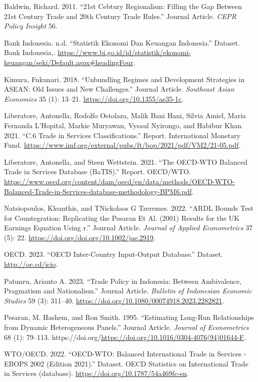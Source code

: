 \documentclass[
  a4paper,
  DIV=11,
  numbers=noendperiod]{scrreprt}
\newlength{\cslhangindent}
\newenvironment{CSLReferences}[2] %
 {\begin{list}{}{%
  \setlength{\itemindent}{0pt}
  \setlength{\leftmargin}{0pt}
  \setlength{\parsep}{0pt}
  \ifodd #1
   \setlength{\leftmargin}{\cslhangindent}
   \setlength{\itemindent}{-1\cslhangindent}
  \fi
  \setlength{\itemsep}{#2\baselineskip}}}
 {\end{list}}
\begin{document}
\label{refs}
\begin{CSLReferences}{1}{0}
Baldwin, Richard. 2011. {``21st Cebtury Regionalism: Filling the Gap
Between 21st Century Trade and 20th Century Trade Rules.''} Journal
Article. \emph{CEPR Policy Insight} 56.

Bank Indonesia. n.d. {``Statistik Ekonomi Dan Keuangan Indonesia.''}
Dataset. Bank Indonesia,.
\url{https://www.bi.go.id/id/statistik/ekonomi-keuangan/seki/Default.aspx\#headingFour}.

Kimura, Fukunari. 2018. {``Unbundling Regimes and Development Strategies
in ASEAN: Old Issues and New Challenges.''} Journal Article.
\emph{Southeast Asian Economies} 35 (1): 13--21.
\url{https://doi.org/10.1355/ae35-1c}.

Liberatore, Antonella, Rodolfo Ostolaza, Malik Bani Hani, Silvia Amiel,
Maria Fernanda L'Hopital, Markie Muryawan, Vysaul Nyirongo, and Habibur
Khan. 2021. {``C.6 Trade in Services Classifications.''} Report.
International Monetary Fund.
\url{https://www.imf.org/external/pubs/ft/bop/2021/pdf/VM2/21-05.pdf}.

Liberatore, Antonella, and Steen Wettstein. 2021. {``The OECD-WTO
Balanced Trade in Services Database (BaTIS).''} Report. OECD/WTO.
\url{https://www.oecd.org/content/dam/oecd/en/data/methods/OECD-WTO-Balanced-Trade-in-Services-database-methodology-BPM6.pdf}.

Natsiopoulos, Kleanthis, and TNickolaos G Tzeremes. 2022. {``ARDL Bounds
Test for Countegration: Replicating the Pesaran Et Al. (2001) Results
for the UK Earnings Equation Using r.''} Journal Article. \emph{Journal
of Applied Econometrics} 37 (5): 22.
\url{https://doi.org/doi.org/10.1002/jae.2919}.

OECD. 2023. {``OECD Inter-Country Input-Output Database.''} Dataset.
\url{http://oe.cd/icio}.

Patunru, Arianto A. 2023. {``Trade Policy in Indonesia: Between
Ambivalence, Pragmatism and Nationalism.''} Journal Article.
\emph{Bulletin of Indonesian Economic Studies} 59 (3): 311--40.
\url{https://doi.org/10.1080/00074918.2023.2282821}.

Pesaran, M. Hashem, and Ron Smith. 1995. {``Estimating Long-Run
Relationships from Dynamic Heterogeneous Panels.''} Journal Article.
\emph{Journal of Econometrics} 68 (1): 79--113.
https://doi.org/\url{https://doi.org/10.1016/0304-4076(94)01644-F}.

WTO/OECD. 2022. {``OECD-WTO: Balanced International Trade in Services -
EBOPS 2002 (Edition 2021).''} Dataset. OECD Statistics on International
Trade in Services (database). \url{https://doi.org/10.1787/54a469fc-en}.

\end{CSLReferences}
\end{document}
